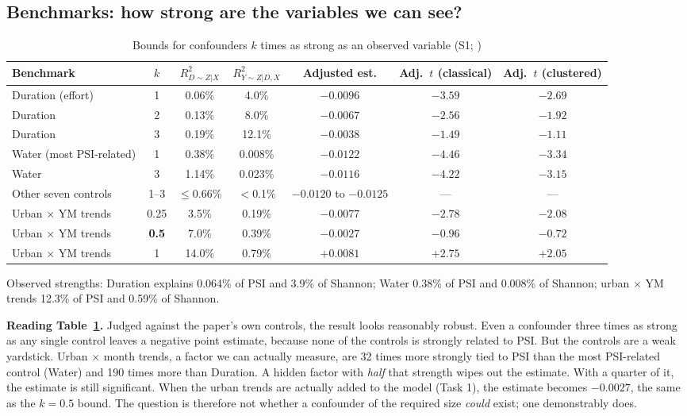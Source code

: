 \documentclass[11pt]{article}
\begin{document}
\subsection{Benchmarks: how strong are the variables we can see?}
\begin{table}[H]\centering\small
\caption{Bounds for confounders $k$ times as strong as an observed variable (S1; )}\label{tab:bounds}
\begin{adjustbox}{max width=\linewidth}
\begin{tabular}{lcccccc}
\toprule
Benchmark & $k$ & $R^2_{D\sim Z|X}$ & $R^2_{Y\sim Z|D,X}$ & Adjusted est. & Adj.\ $t$ (classical) & Adj.\ $t$ (clustered)\\
\midrule
Duration (effort) & 1 & 0.06\% & 4.0\% & $-0.0096$ & $-3.59$ & $-2.69$\\
Duration & 2 & 0.13\% & 8.0\% & $-0.0067$ & $-2.56$ & $\mathbf{-1.92}$\\
Duration & 3 & 0.19\% & 12.1\% & $-0.0038$ & $-1.49$ & $-1.11$\\
Water (most PSI-related) & 1 & 0.38\% & 0.008\% & $-0.0122$ & $-4.46$ & $-3.34$\\
Water & 3 & 1.14\% & 0.023\% & $-0.0116$ & $-4.22$ & $-3.15$\\
Other seven controls & 1--3 & $\le$0.66\% & $<$0.1\% & $-0.0120$ to $-0.0125$ & --- & ---\\
\midrule
Urban $\times$ YM trends & 0.25 & 3.5\% & 0.19\% & $-0.0077$ & $-2.78$ & $-2.08$\\
Urban $\times$ YM trends & \textbf{0.5} & 7.0\% & 0.39\% & $\mathbf{-0.0027}$ & $-0.96$ & $-0.72$\\
Urban $\times$ YM trends & 1 & 14.0\% & 0.79\% & $+0.0081$ & $+2.75$ & $+2.05$\\
\bottomrule
\end{tabular}
\end{adjustbox}
\par\smallskip\footnotesize Observed strengths: Duration explains 0.064\% of PSI and 3.9\% of Shannon; Water 0.38\% of PSI and 0.008\% of Shannon; urban $\times$ YM trends 12.3\% of PSI and 0.59\% of Shannon.
\end{table}

\begin{whybox}\small
\textbf{Reading Table~\ref{tab:bounds}.} Judged against the paper's own controls, the result looks reasonably robust. Even a confounder three times as strong as any single control leaves a negative point estimate, because none of the controls is strongly related to PSI. But the controls are a weak yardstick. Urban $\times$ month trends, a factor we can actually measure, are 32 times more strongly tied to PSI than the most PSI-related control (Water) and 190 times more than Duration. A hidden factor with \emph{half} that strength wipes out the estimate. With a quarter of it, the estimate is still significant. When the urban trends are actually added to the model (Task 1), the estimate becomes $-0.0027$, the same as the $k=0.5$ bound. The question is therefore not whether a confounder of the required size \emph{could} exist; one demonstrably does.
\end{whybox}
\end{document}
